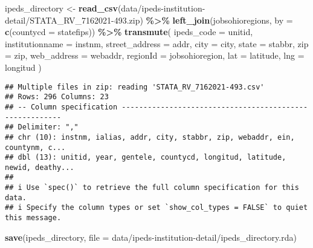 \documentclass[
]{article}
\newenvironment{Shaded}{\begin{snugshade}}{\end{snugshade}}
\newcommand{\AttributeTok}[1]{\textcolor[rgb]{0.13,0.29,0.53}{#1}}
\newcommand{\FunctionTok}[1]{\textcolor[rgb]{0.13,0.29,0.53}{\textbf{#1}}}
\newcommand{\NormalTok}[1]{#1}
\newcommand{\OtherTok}[1]{\textcolor[rgb]{0.56,0.35,0.01}{#1}}
\newcommand{\SpecialCharTok}[1]{\textcolor[rgb]{0.81,0.36,0.00}{\textbf{#1}}}
\newcommand{\StringTok}[1]{\textcolor[rgb]{0.31,0.60,0.02}{#1}}
\begin{document}
\begin{Shaded}
\begin{Highlighting}[]
\NormalTok{ipeds\_directory }\OtherTok{\textless{}{-}} \FunctionTok{read\_csv}\NormalTok{(}\StringTok{\textquotesingle{}data/ipeds{-}institution{-}detail/STATA\_RV\_7162021{-}493.zip\textquotesingle{}}\NormalTok{) }\SpecialCharTok{\%\textgreater{}\%} 
  \FunctionTok{left\_join}\NormalTok{(jobsohioregions, }\AttributeTok{by =} \FunctionTok{c}\NormalTok{(}\StringTok{\textquotesingle{}countycd\textquotesingle{}} \OtherTok{=} \StringTok{\textquotesingle{}statefips\textquotesingle{}}\NormalTok{)) }\SpecialCharTok{\%\textgreater{}\%} 
  \FunctionTok{transmute}\NormalTok{(}
    \AttributeTok{ipeds\_code =}\NormalTok{ unitid,}
    \AttributeTok{institutionname =}\NormalTok{ instnm,}
    \AttributeTok{street\_address =}\NormalTok{ addr,}
    \AttributeTok{city =}\NormalTok{ city,}
    \AttributeTok{state =}\NormalTok{ stabbr,}
    \AttributeTok{zip =}\NormalTok{ zip,}
    \AttributeTok{web\_address =}\NormalTok{ webaddr,}
    \AttributeTok{regionId =}\NormalTok{ jobsohioregion,}
    \AttributeTok{lat =}\NormalTok{ latitude,}
    \AttributeTok{lng =}\NormalTok{ longitud}
\NormalTok{  )}
\end{Highlighting}
\end{Shaded}

\begin{verbatim}
## Multiple files in zip: reading 'STATA_RV_7162021-493.csv'
## Rows: 296 Columns: 23
## -- Column specification --------------------------------------------------------
## Delimiter: ","
## chr (10): instnm, ialias, addr, city, stabbr, zip, webaddr, ein, countynm, c...
## dbl (13): unitid, year, gentele, countycd, longitud, latitude, newid, deathy...
## 
## i Use `spec()` to retrieve the full column specification for this data.
## i Specify the column types or set `show_col_types = FALSE` to quiet this message.
\end{verbatim}

\begin{Shaded}
\begin{Highlighting}[]
\FunctionTok{save}\NormalTok{(ipeds\_directory, }\AttributeTok{file =} \StringTok{\textquotesingle{}data/ipeds{-}institution{-}detail/ipeds\_directory.rda\textquotesingle{}}\NormalTok{)}
\end{Highlighting}
\end{Shaded}
\end{document}
